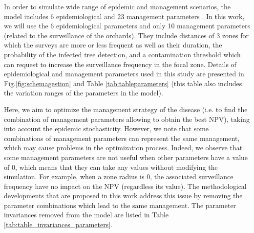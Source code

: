 In order to simulate wide range of epidemic and management scenarios, the model includes 6 epidemiological and 23 management parameters \cite{rimbaud2018heuristic,picard2018}. 
In this work, we will use the 6 epidemiological parameters and only 10 management parameters (related to the surveillance of the orchards). 
They include distances of 3 zones for which the surveys are more or less frequent as well as their duration, the probability of the infected tree detection, 
and a contamination threshold which can request to increase the surveillance frequency in the focal zone. 
Details of epidemiological and management parameters used in this study are presented in Fig.\ref{fig:schemagestion} and Table \ref{tab:tableparameters} 
(this table also includes the variation ranges of the parameters in the model).

Here, we aim to optimize the management strategy of the disease (i.e. to find the combination of management parameters allowing to obtain the best NPV), 
taking into account the epidemic stochasticity. However, we note that some combinations of management parameters can represent the same management, 
which may cause problems in the optimization process. Indeed, we observe that some management parameters are not useful when other parameters have a value of 0, 
which means that they can take any values without modifying the simulation. For example, when a zone radius is 0, the associated surveillance frequency have no impact on the NPV (regardless its value). 
The methodological developments that are proposed in this work address this issue by removing the parameter combinations which lead to the same management. 
The parameter invariances removed from the model are listed in Table \ref{tab:table_invariances_parameters}.

